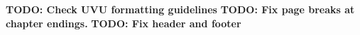 \documentclass[letterpaper, 12pt, openany, notitlepage]{report}
\begin{document}

\textbf{TODO: Check UVU formatting guidelines}
\textbf{TODO: Fix page breaks at chapter endings.}
\textbf{TODO: Fix header and footer}


\tableofcontents
\listoftables
\listoffigures

\newpage

\pagestyle{fancy}

\begin{multicols}{2}










%



\end{multicols}
\newpage
\appendix


\printbibliography[title=References,heading=bibintoc]



%
\end{document}
